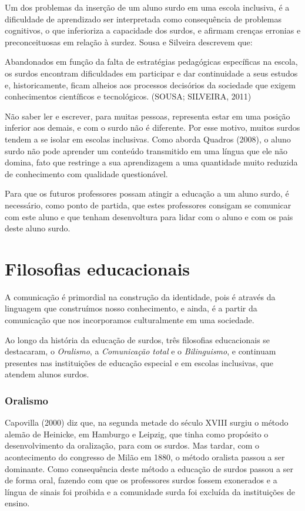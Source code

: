 \documentclass[brasil]{abnt}
\begin{document}
	Um dos problemas da inserção de um aluno surdo em uma escola inclusiva, é a dificuldade de aprendizado ser interpretada como consequência de problemas cognitivos, o que inferioriza
	a capacidade dos surdos, e afirmam crenças erronias e preconceituosas em relação à surdez. Sousa e Silveira descrevem que:
	
		\begin{citacao} Abandonados em função da falta de estratégias pedagógicas específicas na escola, os surdos encontram dificuldades em participar e dar continuidade a
						seus estudos e, historicamente, ficam alheios aos processos decisórios da sociedade que exigem conhecimentos científicos e tecnológicos. (SOUSA; SILVEIRA, 2011)
		\end{citacao}
		
	Não saber ler e escrever, para muitas pessoas, representa estar em uma posição inferior aos demais, e com o surdo não é diferente. Por esse motivo, muitos surdos tendem a se isolar em
	escolas inclusivas. Como aborda Quadros (2008), o aluno surdo não pode aprender um conteúdo transmitido em uma língua que ele não domina, fato que restringe a sua aprendizagem a uma 
	quantidade muito reduzida de conhecimento com qualidade questionável. 
	
	Para que os futuros professores possam atingir a educação a um aluno surdo, é necessário, como ponto de partida, que estes professores consigam se comunicar com este aluno e que tenham desenvoltura 
	para lidar com o aluno e com os pais deste aluno surdo.

\chapter{Filosofias educacionais}
		A comunicação é primordial na construção da identidade, pois é através da linguagem que construímos nosso conhecimento, e ainda, é a partir da comunicação que nos incorporamos culturalmente em uma 
		sociedade. 
		
		Ao longo da história da educação de surdos, três filosofias educacionais se destacaram, o \textit{Oralismo}, a \textit{Comunicação total} e o \textit{Bilinguismo}, e continuam presentes 
		nas instituições de educação especial e em escolas inclusivas, que atendem alunos surdos.
		
		\subsection{Oralismo}
		 Capovilla (2000) diz que, na segunda metade do século XVIII surgiu o método alemão de Heinicke, em Hamburgo e Leipzig, que tinha como propósito o desenvolvimento da oralização, para com os surdos. 
		 Mas tardar, com o acontecimento do congresso de Milão em 1880, o método oralista passou a ser dominante. Como consequência deste método a educação de surdos passou a ser de forma oral, fazendo 
		 com que os professores surdos fossem exonerados e a língua de sinais foi proibida e a comunidade surda foi excluída da instituições de ensino. 
		 
\end{document}
